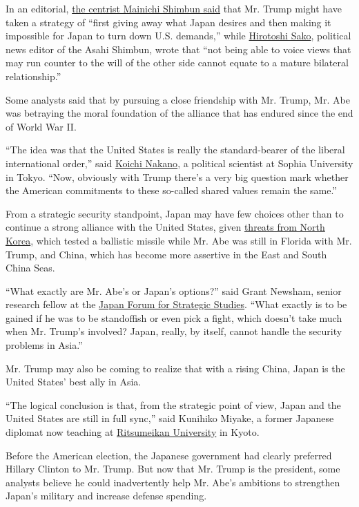 In an editorial,
\href{http://mainichi.jp/english/articles/20170212/p2a/00m/0na/009000c}{the
centrist Mainichi Shimbun said} that Mr. Trump might have taken a
strategy of ``first giving away what Japan desires and then making it
impossible for Japan to turn down U.S. demands,'' while
\href{http://www.asahi.com/ajw/articles/AJ201702120030.html}{Hirotoshi
Sako}, political news editor of the Asahi Shimbun, wrote that ``not
being able to voice views that may run counter to the will of the other
side cannot equate to a mature bilateral relationship.''

Some analysts said that by pursuing a close friendship with Mr. Trump,
Mr. Abe was betraying the moral foundation of the alliance that has
endured since the end of World War II.

``The idea was that the United States is really the standard-bearer of
the liberal international order,'' said
\href{http://www.fla.sophia.ac.jp/professors/nakanokoichi}{Koichi
Nakano}, a political scientist at Sophia University in Tokyo. ``Now,
obviously with Trump there's a very big question mark whether the
American commitments to these so-called shared values remain the same.''

From a strategic security standpoint, Japan may have few choices other
than to continue a strong alliance with the United States, given
\href{https://www.nytimes.com/2017/02/13/world/asia/north-korea-missile-launch-success.html?ref=asia}{threats
from North Korea}, which tested a ballistic missile while Mr. Abe was
still in Florida with Mr. Trump, and China, which has become more
assertive in the East and South China Seas.

``What exactly are Mr. Abe's or Japan's options?'' said Grant Newsham,
senior research fellow at the
\href{http://www.jfss.gr.jp/english/aboutus-en.htm}{Japan Forum for
Strategic Studies}. ``What exactly is to be gained if he was to be
standoffish or even pick a fight, which doesn't take much when Mr.
Trump's involved? Japan, really, by itself, cannot handle the security
problems in Asia.''

Mr. Trump may also be coming to realize that with a rising China, Japan
is the United States' best ally in Asia.

``The logical conclusion is that, from the strategic point of view,
Japan and the United States are still in full sync,'' said Kunihiko
Miyake, a former Japanese diplomat now teaching at
\href{http://en.ritsumei.ac.jp/}{Ritsumeikan University} in Kyoto.

Before the American election, the Japanese government had clearly
preferred Hillary Clinton to Mr. Trump. But now that Mr. Trump is the
president, some analysts believe he could inadvertently help Mr. Abe's
ambitions to strengthen Japan's military and increase defense spending.

